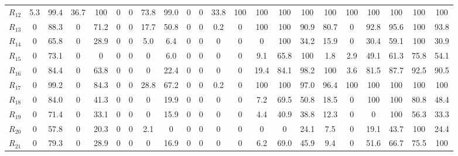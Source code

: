 \begin{table}[h!]
\begin{tabularx}{\textwidth}{X|CCCCCCCCCCCCCCCCCCCCC}
$R_{12}$ & 5.3 & 99.4 & 36.7 & 100 & 0 & 0 & 73.8 & 99.0 & 0 & 0 & 33.8 & 100 & 100 & 100 & 100 & 100 & 100 & 100 & 100 & 100 & 100 \\
$R_{13}$ & 0 & 88.3 & 0 & 71.2 & 0 & 0 & 17.7 & 50.8 & 0 & 0 & 0.2 & 0 & 100 & 100 & 90.9 & 80.7 & 0 & 92.8 & 95.6 & 100 & 93.8 \\
$R_{14}$ & 0 & 65.8 & 0 & 28.9 & 0 & 0 & 5.0 & 6.4 & 0 & 0 & 0 & 0 & 0 & 100 & 34.2 & 15.9 & 0 & 30.4 & 59.1 & 100 & 30.9 \\
$R_{15}$ & 0 & 73.1 & 0 & 0 & 0 & 0 & 0 & 6.0 & 0 & 0 & 0 & 0 & 9.1 & 65.8 & 100 & 1.8 & 2.9 & 49.1 & 61.3 & 75.8 & 54.1 \\
$R_{16}$ & 0 & 84.4 & 0 & 63.8 & 0 & 0 & 0 & 22.4 & 0 & 0 & 0 & 0 & 19.4 & 84.1 & 98.2 & 100 & 3.6 & 81.5 & 87.7 & 92.5 & 90.5 \\
$R_{17}$ & 0 & 99.2 & 0 & 84.3 & 0 & 0 & 28.8 & 67.2 & 0 & 0 & 0.2 & 0 & 100 & 100 & 97.0 & 96.4 & 100 & 100 & 100 & 100 & 100 \\
$R_{18}$ & 0 & 84.0 & 0 & 41.3 & 0 & 0 & 0 & 19.9 & 0 & 0 & 0 & 0 & 7.2 & 69.5 & 50.8 & 18.5 & 0 & 100 & 100 & 80.8 & 48.4 \\
$R_{19}$ & 0 & 71.4 & 0 & 33.1 & 0 & 0 & 0 & 15.9 & 0 & 0 & 0 & 0 & 4.4 & 40.9 & 38.8 & 12.3 & 0 & 0 & 100 & 56.3 & 33.3 \\
$R_{20}$ & 0 & 57.8 & 0 & 20.3 & 0 & 0 & 2.1 & 0 & 0 & 0 & 0 & 0 & 0 & 0 & 24.1 & 7.5 & 0 & 19.1 & 43.7 & 100 & 24.4 \\
$R_{21}$ & 0 & 79.3 & 0 & 28.9 & 0 & 0 & 0 & 16.9 & 0 & 0 & 0 & 0 & 6.2 & 69.0 & 45.9 & 9.4 & 0 & 51.6 & 66.7 & 75.5 & 100 \\
\bottomrule
\end{tabularx}
\end{table}
